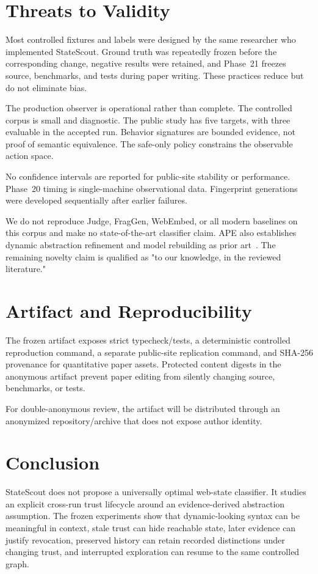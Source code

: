 \documentclass[conference]{IEEEtran}
\begin{document}
\section{Threats to Validity}
Most controlled fixtures and labels were designed by the same researcher who implemented StateScout. Ground truth was repeatedly frozen before the corresponding change, negative results were retained, and Phase~21 freezes source, benchmarks, and tests during paper writing. These practices reduce but do not eliminate bias.

The production observer is operational rather than complete. The controlled corpus is small and diagnostic. The public study has five targets, with three evaluable in the accepted run. Behavior signatures are bounded evidence, not proof of semantic equivalence. The safe-only policy constrains the observable action space.

No confidence intervals are reported for public-site stability or performance. Phase~20 timing is single-machine observational data. Fingerprint generations were developed sequentially after earlier failures.

We do not reproduce Judge, FragGen, WebEmbed, or all modern baselines on this corpus and make no state-of-the-art classifier claim. APE also establishes dynamic abstraction refinement and model rebuilding as prior art~\cite{gu2019ape}. The remaining novelty claim is qualified as "to our knowledge, in the reviewed literature."

\section{Artifact and Reproducibility}
The frozen artifact exposes strict typecheck/tests, a deterministic controlled reproduction command, a separate public-site replication command, and SHA-256 provenance for quantitative paper assets. Protected content digests in the anonymous artifact prevent paper editing from silently changing source, benchmarks, or tests.

For double-anonymous review, the artifact will be distributed through an anonymized repository/archive that does not expose author identity.

\section{Conclusion}
StateScout does not propose a universally optimal web-state classifier. It studies an explicit cross-run trust lifecycle around an evidence-derived abstraction assumption. The frozen experiments show that dynamic-looking syntax can be meaningful in context, stale trust can hide reachable state, later evidence can justify revocation, preserved history can retain recorded distinctions under changing trust, and interrupted exploration can resume to the same controlled graph.
\end{document}
